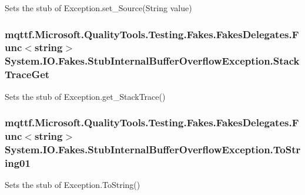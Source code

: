 Sets the stub of Exception.\-set\-\_\-\-Source(\-String value)

\hypertarget{class_system_1_1_i_o_1_1_fakes_1_1_stub_internal_buffer_overflow_exception_a8b817b46d4efc96822af74cd4a64cf06}{
\subsubsection[{Stack\-Trace\-Get}]{\setlength{\rightskip}{0pt plus 5cm}mqttf.\-Microsoft.\-Quality\-Tools.\-Testing.\-Fakes.\-Fakes\-Delegates.\-Func$<$string$>$ System.\-I\-O.\-Fakes.\-Stub\-Internal\-Buffer\-Overflow\-Exception.\-Stack\-Trace\-Get}}\label{class_system_1_1_i_o_1_1_fakes_1_1_stub_internal_buffer_overflow_exception_a8b817b46d4efc96822af74cd4a64cf06}


Sets the stub of Exception.\-get\-\_\-\-Stack\-Trace()

\hypertarget{class_system_1_1_i_o_1_1_fakes_1_1_stub_internal_buffer_overflow_exception_a48ef076b01f11e6e0629e3fc880fd0ea}{
\subsubsection[{To\-String01}]{\setlength{\rightskip}{0pt plus 5cm}mqttf.\-Microsoft.\-Quality\-Tools.\-Testing.\-Fakes.\-Fakes\-Delegates.\-Func$<$string$>$ System.\-I\-O.\-Fakes.\-Stub\-Internal\-Buffer\-Overflow\-Exception.\-To\-String01}}\label{class_system_1_1_i_o_1_1_fakes_1_1_stub_internal_buffer_overflow_exception_a48ef076b01f11e6e0629e3fc880fd0ea}


Sets the stub of Exception.\-To\-String()



